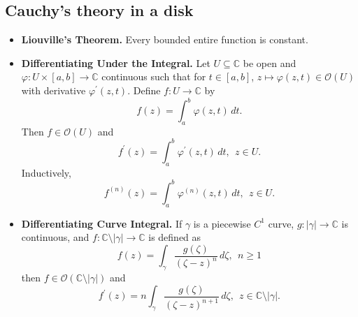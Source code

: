 \documentclass{article}
\newenvironment{topic}[1]{%
{\subsection{#1}}%
\begin{itemize}%
}{%
\end{itemize}%
}
\newcommand{\theorem}[1]{\item {\bf #1.}}
\newcommand{\corollary}[1]{\item {\bf #1.}}
\newcommand{\holo}[1]{\mathcal{O}(#1)}
\begin{document}
\begin{topic}{Cauchy's theory in a disk}
\theorem{Liouville's Theorem} Every bounded entire function is constant.

\theorem{Differentiating Under the Integral} Let $U \subseteq \mathbb{C}$ be open and $\varphi : U \times [a, b] \to \mathbb{C}$ continuous such that for $t \in [a, b]$, $z \mapsto \varphi(z, t) \in \holo{U}$ with derivative $\varphi^\prime(z, t)$. Define $f : U \to \mathbb{C}$  by $$f(z) = \int_a^b \varphi(z, t)\,dt.$$ Then $f \in \holo{U}$ and $$f^\prime(z) = \int_a^b \varphi^\prime(z, t)\,dt,~~z \in U.$$ Inductively, $$f^{(n)}(z) = \int_a^b \varphi^{(n)}(z, t)\,dt,~~z \in U.$$

\corollary{Differentiating Curve Integral} If $\gamma$ is a piecewise $C^1$ curve, $g : |\gamma| \to \mathbb{C}$ is continuous, and $f : \mathbb{C} \setminus |\gamma| \to \mathbb{C}$ is defined as $$f(z) = \int_\gamma \dfrac{g(\zeta)}{(\zeta - z)^n}\,d\zeta,~~n \geq 1$$ then $f \in \holo{\mathbb{C} \setminus |\gamma|}$ and $$f^\prime(z) = n \int_\gamma \dfrac{g(\zeta)}{(\zeta - z)^{n+1}}\,d\zeta,~~z \in \mathbb{C} \setminus |\gamma|.$$

\end{topic}
\end{document}
